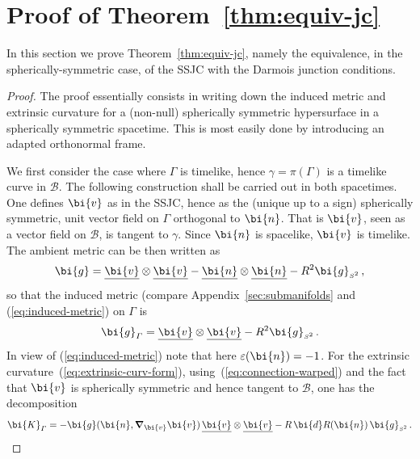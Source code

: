 \documentclass
[rmp,aps,twocolumn,showpacs,preprintnumbers,amsmath,amssymb]{revtex4}
\theoremstyle{plain}
\theoremstyle{definition}
\theoremstyle{remark}
\newcommand{\ul}[1]{\underline{#1}}
\newcommand{\sss}{\scriptscriptstyle}
\newcommand{\bnabla}{\boldsymbol{\nabla}}     %
\newcommand{\ed}{\bi{d}}                      %
\newcommand{\B}{\mathcal{B}}                      %
\newcommand{\Stwo}{{S^2}}                         %
\newcommand{\sStwo}{{\sss \Stwo}}                 %
\newcommand{\gG}{\g_\varGamma}                    %
\newcommand{\gStwo}{\g_\sStwo}                    %
\newcommand{\g}{\bg}                            %
\newcommand{\bg}{\bi{g}}
\newcommand{\bn}{\bi{n}}
\newcommand{\bv}{\bi{v}}
\newcommand{\bK}{\bi{K}}
\begin{document}
\section{Proof of Theorem~\ref{thm:equiv-jc}}
\label{sec:equiv-junct-cond}
%
In this section we prove Theorem~\ref{thm:equiv-jc}, namely the equivalence, 
in the spherically-symmetric case, of the SSJC with the Darmois junction 
conditions.

\begin{proof}
The proof essentially consists in writing down the induced metric and 
extrinsic curvature for a (non-null) spherically symmetric hypersurface 
in a spherically symmetric spacetime. This is most easily done by introducing 
an adapted orthonormal frame.

We first consider the case where $\varGamma$ is timelike, hence 
$\gamma=\pi(\varGamma)$ is a timelike curve in $\B$.
The following construction shall be carried out in both spacetimes. 
One defines $\bv$ as in the SSJC, hence as the (unique up to a sign) 
spherically symmetric, unit vector field on $\varGamma$ orthogonal to $\bn$. 
That is $\bv$, seen as a vector field on $\B$, is tangent to $\gamma$.
Since $\bn$ is spacelike, $\bv$ is timelike.
The ambient metric can be then written as
%
\begin{equation}
  \g = \ul\bv\otimes\ul\bv - \ul\bn\otimes\ul\bn - R^2 \gStwo\,,
\end{equation}
%
so that the induced metric (compare Appendix~\ref{sec:submanifolds} 
and (\ref{eq:induced-metric}) on $\varGamma$ is 
%
\begin{equation}\label{eq:induced-metric-ss}
  \gG = \ul\bv\otimes\ul\bv - R^2 \gStwo \,.
\end{equation}
%
In view of (\ref{eq:induced-metric}) note that here $\varepsilon(\bn)=-1$.
For the extrinsic curvature~(\ref{eq:extrinsic-curv-form}), 
using~(\ref{eq:connection-warped}) and the fact that $\bv$ is spherically 
symmetric and hence tangent to $\B$, one has the decomposition
%
\begin{equation}\label{eq:extrinsic-curv-ss}
  \bK_\varGamma = - \g(\bn,\bnabla_\bv\bv)\,\ul\bv\otimes\ul\bv 
                  - R\,\ed R(\bn)\,\gStwo \,.
\end{equation}
%


\end{proof}
\end{document}
